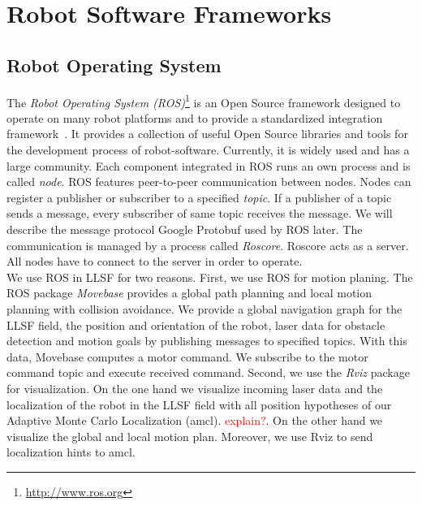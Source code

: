 \section{Robot Software Frameworks}
\label{sec:robot_software_frameworks}
\subsection{Robot Operating System}
The \textit{Robot Operating System (ROS)}\footnote{\url{http://www.ros.org}} is an Open Source framework designed to operate on many robot platforms and to provide a standardized integration framework~\cite{Ros}. It provides a collection of useful Open Source libraries and tools for the development process of robot-software. Currently, it is widely used and has a large community. Each component integrated in ROS runs an own process and is called \textit{node}. ROS features peer-to-peer communication between nodes. Nodes can register a publisher or subscriber to a specified \textit{topic}. If a publisher of a topic sends a message, every subscriber of same topic receives the message. We will describe the message protocol Google Protobuf used by ROS later. The communication is managed by a process called \textit{Roscore}. Roscore acts as a server. All nodes have to connect to the server in order to operate.\\
We use ROS in LLSF for two reasons. First, we use ROS for motion planing. The ROS package \textit{Movebase} provides a global path planning and local motion planning with collision avoidance. We provide a global navigation graph for the LLSF field, the position and orientation of the robot, laser data for obstacle detection and motion goals by publishing messages to specified topics. With this data, Movebase computes a motor command. We subscribe to the motor command topic and execute received command. Second, we use the \textit{Rviz} package for visualization. On the one hand we visualize incoming laser data and the localization of the robot in the LLSF field with all position hypotheses of our Adaptive Monte Carlo Localization (amcl). \textcolor{red}{explain?}. On the other hand we visualize the global and local motion plan. Moreover, we use Rviz to send localization hints to amcl.

